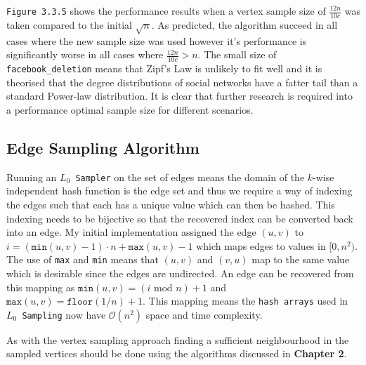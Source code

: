 \documentclass[11pt,twoside,a4paper]{report}
\begin{document}
\texttt{Figure 3.3.5} shows the performance results when a vertex sample size of $\frac{12n}{10c}$ was taken compared to the initial $\sqrt{n}$. As predicted, the algorithm succeed in all cases where the new sample size was used however it's performance is significantly worse in all cases where $\frac{12n}{10c}>n$. The small size of \texttt{facebook\_deletion} means that Zipf's Law is unlikely to fit well and it is theorised that the degree distributions of social networks have a fatter tail than a standard Power-law distribution. It is clear that further research is required into a performance optimal sample size for different scenarios.

\subsection{Edge Sampling Algorithm}

Running an \texttt{$L_0$ Sampler} on the set of edges means the domain of the $k$-wise independent hash function is the edge set and thus we require a way of indexing the edges such that each has a unique value which can then be hashed. This indexing needs to be bijective so that the recovered index can be converted back into an edge. My initial implementation assigned the edge $(u,v)$ to $i=(\mathtt{min}(u,v)-1)\cdot n+\mathtt{max}(u,v)-1$ which maps edges to values in $[0,n^2)$. The use of \texttt{max} and \texttt{min} means that $(u,v)$ and $(v,u)$ map to the same value which is desirable since the edges are undirected. An edge can be recovered from this mapping as $\mathtt{min}(u,v)=(i\text{ mod }n)+1$ and $\mathtt{max}(u,v)=\mathtt{floor}(1/n)+1$. This mapping means the \texttt{hash arrays} used in \texttt{$L_0$ Sampling} now have $\mathcal{O}(n^2)$ space and time complexity. %
\par As with the vertex sampling approach finding a sufficient neighbourhood in the sampled vertices should be done using the algorithms discussed in \textbf{Chapter 2}.
\end{document}
